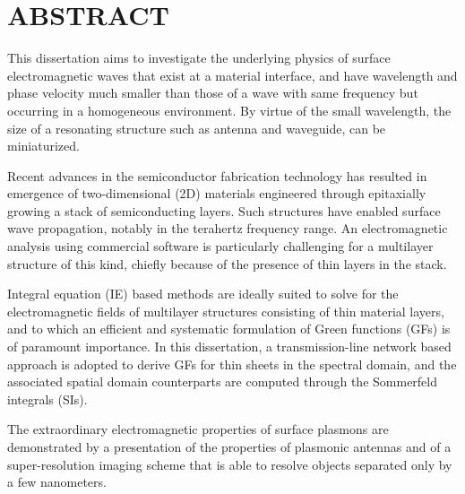 %
%
%

\chapter*{ABSTRACT}

\pagestyle{plain} %
\setcounter{page}{2}

\indent This dissertation aims to investigate the underlying physics of surface electromagnetic waves that exist at a material interface, and have wavelength and phase velocity much smaller than those of a wave with same frequency but occurring in a homogeneous environment. By virtue of the small wavelength, the size of a resonating structure such as antenna and waveguide, can be miniaturized.

Recent advances in the semiconductor fabrication technology has resulted in emergence of two-dimensional (2D) materials engineered through epitaxially growing a stack of semiconducting layers. Such structures have enabled surface wave propagation, notably in the terahertz frequency range. An electromagnetic analysis using commercial software is particularly challenging for a multilayer structure of this kind, chiefly because of the presence of thin layers in the stack.

Integral equation (IE) based methods are ideally suited to solve for the electromagnetic fields of multilayer structures consisting of thin material layers, and to which an efficient and systematic formulation of Green functions (GFs) is of paramount importance. In this dissertation, a transmission-line network based approach is adopted to derive GFs for thin sheets in the spectral domain, and the associated spatial domain counterparts are computed through the Sommerfeld integrals (SIs).

The extraordinary electromagnetic properties of surface plasmons are demonstrated by a presentation of the properties of plasmonic antennas and of a super-resolution imaging scheme that is able to resolve objects separated only by a few nanometers.




